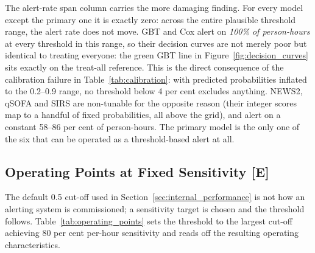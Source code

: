 The alert-rate span column carries the more damaging finding. For every model
except the primary one it is exactly zero: across the entire plausible
threshold range, the alert rate does not move. GBT and Cox alert on
\emph{100\% of person-hours} at every threshold in this range, so their
decision curves are
not merely poor but identical to treating everyone: the green GBT line in
Figure~\ref{fig:decision_curves} sits exactly on the treat-all reference.
This is the direct consequence of the calibration failure in
Table~\ref{tab:calibration}: with predicted probabilities inflated to the
0.2--0.9 range, no threshold below 4 per cent excludes anything. NEWS2, qSOFA
and SIRS are non-tunable for the opposite reason (their integer scores map
to a handful of fixed probabilities, all above the grid), and alert on a
constant 58--86 per cent of person-hours. The primary model is the only one of
the six that can be operated as a threshold-based alert at all.

\subsection{Operating Points at Fixed Sensitivity \texorpdfstring{[E]}{[E]}}
\label{sec:operating_points}

The default 0.5 cut-off used in Section~\ref{sec:internal_performance} is not
how an alerting system is commissioned; a sensitivity target is chosen and the
threshold follows. Table~\ref{tab:operating_points} sets the threshold to the
largest cut-off achieving 80 per cent per-hour sensitivity and reads off the
resulting operating characteristics.

